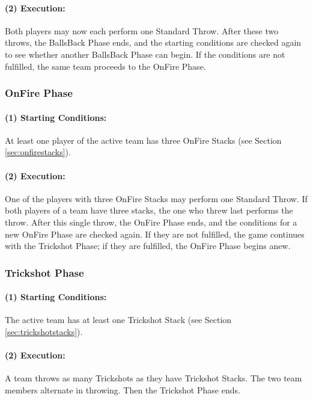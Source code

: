 \documentclass[a5paper, 12pt]{book}
\begin{document}
\paragraph{(2) Execution:}  
Both players may now each perform one Standard Throw.  
After these two throws, the BallsBack Phase ends, and the starting conditions are checked again to see whether another BallsBack Phase can begin.  
If the conditions are not fulfilled, the same team proceeds to the OnFire Phase.

\subsubsection{OnFire Phase}\label{sec:onfire}

\paragraph{(1) Starting Conditions:}  
At least one player of the active team has three OnFire Stacks (see Section \ref{sec:onfirestacks}).

\paragraph{(2) Execution:}  
One of the players with three OnFire Stacks may perform one Standard Throw.  
If both players of a team have three stacks, the one who threw last performs the throw.  
After this single throw, the OnFire Phase ends, and the conditions for a new OnFire Phase are checked again.  
If they are not fulfilled, the game continues with the Trickshot Phase; if they are fulfilled, the OnFire Phase begins anew.

\subsubsection{Trickshot Phase}\label{sec:trickshotphase}

\paragraph{(1) Starting Conditions:}  
The active team has at least one Trickshot Stack (see Section \ref{sec:trickshotstacks}).

\paragraph{(2) Execution:}  
A team throws as many Trickshots as they have Trickshot Stacks.  
The two team members alternate in throwing.  
Then the Trickshot Phase ends.
\end{document}
